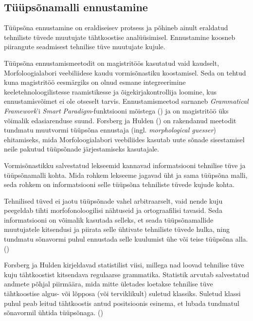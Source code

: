 \documentclass[12pt,a4paper]{article}
\begin{document}
\subsection{Tüüpsõnamalli ennustamine}
\label{sec:ekstraktmorfoloogia-ennustamine}

Tüüpsõna ennustamine on eraldiseisev protsess ja põhineb ainult eraldatud tehniliste tüvede muutujate tähtkoostise analüüsimisel. Ennustamine koosneb piirangute seadmisest tehnilise tüve muutujate kujule.

Tüüpsõna ennustamismeetodit on magistritöös kasutatud vaid kaudselt, Morfoloogialabori veebiliidese kaudu vormisõnastiku koostamisel. Seda on tehtud kuna magistritöö eesmärgiks on olnud esmane integreerimine keeletehnoloogilistesse raamistikesse ja õigekirjakontrollija loomine, kus ennustamisvõimet ei ole otseselt tarvis. Ennustamismeetod sarnaneb \textit{Grammatical Framework}'i \textit{Smart Paradigm}-funktsiooni mõistega (\cite{detrez_smart_2012}) ja on magistritöö üks võimalik edasiarenduse suund. Forsberg ja Hulden (\citeyear{forsberg_deriving_2016}) on rakendanud meetodit tundmatu muutvormi tüüpsõna ennustaja (ingl. \textit{morphological guesser}) ehitamiseks, mida Morfoloogialabori veebiliides kasutab uute sõnade sisestamisel neile pakutud tüüpsõnade järjestamiseks kasutajale.

Vormisõnastikku salvestatud lekseemid kannavad informatsiooni tehnilise tüve ja tüüpsõnamalli kohta. Mida rohkem lekseeme jagavad üht ja sama tüüpsõna malli, seda rohkem on informatsiooni selle tüüpsõna tehniliste tüvede kujude kohta.

Tehnilised tüved ei jaotu tüüpsõnade vahel arbitraarselt, vaid nende kuju peegeldab tihti morfo\-fonoloogilisi nähtuseid ja orto\-graafilisi tavasid. Seda informatsiooni on võimalik kasutada selleks, et seada tüüp\-sõna\-mallide muutujatele kitsendusi ja piirata selle ühtivate tehniliste tüvede hulka, ning tundmatu sõnavormi puhul ennustada selle kuulumist ühe või teise tüüpsõna alla. (\cite[2579]{forsberg_deriving_2016})

Forsberg ja Hulden kirjeldavad statistilist viisi, millega nad loovad tehnilise tüve kuju tähtkoostist kitsendava regulaarse grammatika. Statistik arvutab salvestatud andmete põhjal piirmäära, mida mitte ületades loetakse tehnilise tüve tähtkoostise algus- või lõpposa (või terviklikult) suletud klassiks. Suletud klassi puhul peab leitud tähtkoostis antud positsioonis esinema, et lubada tundmatul sõnavormil ühtida tüüpsõnaga. (\cite[2580]{forsberg_deriving_2016})
\end{document}

